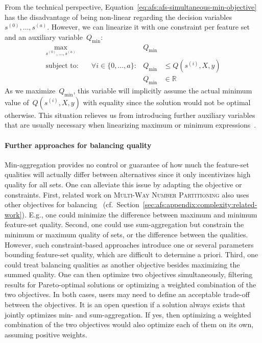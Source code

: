 \documentclass{article}
\theoremstyle{definition}
\begin{document}
From the technical perspective, Equation~\ref{eq:afs:afs-simultaneous-min-objective} has the disadvantage of being non-linear regarding the decision variables $s^{(0)}, \dots, s^{(a)}$.
However, we can linearize it with one constraint per feature set and an auxiliary variable~$Q_{\text{min}}$:
%
\begin{equation}
	\begin{aligned}
		\max_{s^{(0)}, \dots, s^{(a)}} &\quad &Q_{\text{min}} & \\
		\text{subject to:} &\quad \forall i \in \{0, \dots, a\}: &Q_{\text{min}} &\leq Q(s^{(i)},X,y) \\
		&\quad & Q_{\text{min}} &\in \mathbb{R}
	\end{aligned}
	\label{eq:afs:afs-simultaneous-min-objective-linear}
\end{equation}
%
As we maximize~$Q_{\text{min}}$, this variable will implicitly assume the actual minimum value of~$Q(s^{(i)},X,y)$ with equality since the solution would not be optimal otherwise.
This situation relieves us from introducing further auxiliary variables that are usually necessary when linearizing maximum or minimum expressions~\cite{mosek2022modeling}.

\paragraph{Further approaches for balancing quality}

Min-aggregation provides no control or guarantee of how much the feature-set qualities will actually differ between alternatives since it only incentivizes high quality for all sets.
One can alleviate this issue by adapting the objective or constraints.
First, related work on \textsc{Multi-Way Number Partitioning} also uses other objectives for balancing~\cite{korf2010objective, lawrinenko2017identical} (cf.~Section~\ref{sec:afs:appendix:complexity:related-work}).
E.g., one could minimize the difference between maximum and minimum feature-set quality.
Second, one could use sum-aggregation but constrain the minimum or maximum quality of sets, or the difference between the qualities.
However, such constraint-based approaches introduce one or several parameters bounding feature-set quality, which are difficult to determine a priori.
Third, one could treat balancing qualities as another objective besides maximizing the summed quality.
One can then optimize two objectives simultaneously, filtering results for Pareto-optimal solutions or optimizing a weighted combination of the two objectives.
In both cases, users may need to define an acceptable trade-off between the objectives.
It is an open question if a solution always exists that jointly optimizes min- and sum-aggregation.
If yes, then optimizing a weighted combination of the two objectives would also optimize each of them on its own, assuming positive weights.
\end{document}
